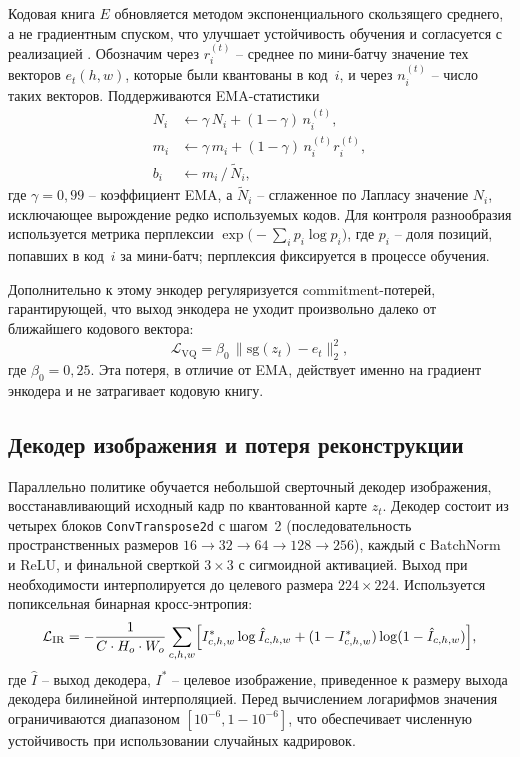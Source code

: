 Кодовая книга $E$ обновляется методом экспоненциального скользящего среднего, а не градиентным спуском, что улучшает устойчивость обучения и согласуется с реализацией \cite{vandeoord2017neural}. Обозначим через $r_i^{(t)}$ -- среднее по мини-батчу значение тех векторов $e_t(h,w)$, которые были квантованы в код~$i$, и через $n_i^{(t)}$ -- число таких векторов. Поддерживаются EMA-статистики
\begin{equation}
    \label{eq:vq-ema}
    \begin{aligned}
        N_i &\leftarrow \gamma\, N_i + (1 - \gamma)\, n_i^{(t)},\\
        m_i &\leftarrow \gamma\, m_i + (1 - \gamma)\, n_i^{(t)} r_i^{(t)},\\
        b_i &\leftarrow m_i \,/\, \tilde{N}_i,
    \end{aligned}
\end{equation}
где $\gamma = 0{,}99$ -- коэффициент EMA, а $\tilde{N}_i$ -- сглаженное по Лапласу значение $N_i$, исключающее вырождение редко используемых кодов. Для контроля разнообразия используется метрика перплексии $\exp\!\bigl(-\sum_i p_i \log p_i\bigr)$, где $p_i$ -- доля позиций, попавших в
код~$i$ за мини-батч; перплексия фиксируется в процессе обучения.

Дополнительно к этому энкодер регуляризуется commitment-потерей, гарантирующей, что выход энкодера не уходит произвольно далеко от ближайшего кодового вектора:
\begin{equation}
    \label{eq:vq-commit}
    \mathcal{L}_{\text{VQ}} = \beta_0 \,\bigl\| \mathrm{sg}(z_t) - e_t \bigr\|_{2}^{2},
\end{equation}
где $\beta_0 = 0{,}25$. Эта потеря, в отличие от EMA, действует именно на градиент энкодера и не затрагивает кодовую книгу.

\subsection{Декодер изображения и потеря реконструкции}
\label{subsec:vq-decoder}

Параллельно политике обучается небольшой сверточный декодер изображения, восстанавливающий исходный кадр по квантованной карте $z_t$. Декодер состоит из четырех блоков \texttt{ConvTranspose2d} с шагом~2 (последовательность пространственных размеров $16 \to 32 \to 64 \to 128 \to 256$), каждый с BatchNorm и ReLU, и финальной сверткой $3{\times}3$ с сигмоидной активацией. Выход при необходимости интерполируется до целевого размера $224{\times}224$. Используется попиксельная бинарная кросс-энтропия:
\begin{equation}
    \label{eq:vq-recon}
    \mathcal{L}_{\text{IR}} = -\frac{1}{C \cdot H_o \cdot W_o}
       \sum_{c, h, w}
       \Bigl[
         I^{\ast}_{c,h,w} \log \hat{I}_{c,h,w}
         + (1 - I^{\ast}_{c,h,w}) \log (1 - \hat{I}_{c,h,w})
       \Bigr],
\end{equation}
где $\hat{I}$ -- выход декодера, $I^{\ast}$ -- целевое изображение, приведенное к размеру выхода декодера билинейной интерполяцией. Перед вычислением логарифмов значения ограничиваются диапазоном $[10^{-6}, 1 - 10^{-6}]$, что обеспечивает численную устойчивость при использовании случайных кадрировок.

